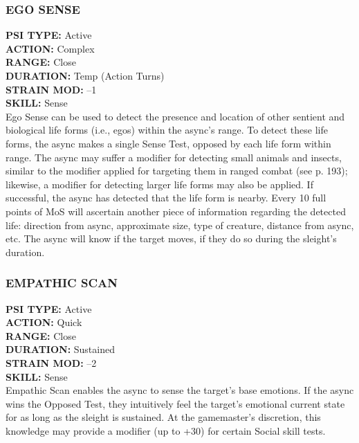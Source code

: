 \subsubsection{EGO SENSE}
\textbf{PSI TYPE:} Active \\ 
\textbf{ACTION:} Complex \\ 
\textbf{RANGE:} Close \\ 
\textbf{DURATION:} Temp (Action Turns) \\
\textbf{STRAIN MOD:} –1 \\ 
\textbf{SKILL:} Sense\\
Ego Sense can be used to detect the presence and
location of other sentient and biological life forms
(i.e., egos) within the async’s range. To detect these
life forms, the async makes a single Sense Test, opposed
by each life form within range. The async may
suffer a modifier for detecting small animals and
insects, similar to the modifier applied for targeting
them in ranged combat (see p. 193); likewise, a
modifier for detecting larger life forms may also be
applied. If successful, the async has detected that the
life form is nearby. Every 10 full points of MoS will
ascertain another piece of information regarding the
detected life: direction from async, approximate size,
type of creature, distance from async, etc. The async
will know if the target moves, if they do so during the
sleight’s duration.

\subsubsection{EMPATHIC SCAN}
\textbf{PSI TYPE:} Active \\ 
\textbf{ACTION:} Quick \\ 
\textbf{RANGE:} Close \\ 
\textbf{DURATION:} Sustained \\
\textbf{STRAIN MOD:} –2 \\ 
\textbf{SKILL:} Sense\\
Empathic Scan enables the async to sense the target’s
base emotions. If the async wins the Opposed Test,
they intuitively feel the target’s emotional current state
for as long as the sleight is sustained. At the gamemaster’s
discretion, this knowledge may provide a modifier
(up to +30) for certain Social skill tests.

